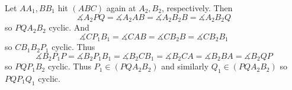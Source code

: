 Let $AA_1,BB_1$ hit $(ABC)$ again at $A_2,B_2$, respectively. Then \[\measuredangle{A_2PQ}=\measuredangle{A_2AB}=\measuredangle{A_2B_2B}=\measuredangle{A_2B_2Q}\] so $PQA_2B_2$ cyclic. And \[\measuredangle{CP_1B_1}=\measuredangle{CAB}=\measuredangle{CB_2B}=\measuredangle{CB_2B_1}\] so $CB_1B_2P_1$ cyclic. Thus \[\measuredangle{B_2P_1P}=\measuredangle{B_2P_1B_1}=\measuredangle{B_2CB_1}=\measuredangle{B_2CA}=\measuredangle{B_2BA}=\measuredangle{B_2QP}\] so $PQP_1B_2$ cyclic. Thus $P_1\in(PQA_2B_2)$ and similarly $Q_1\in(PQA_2B_2)$ so $PQP_1Q_1$ cyclic.